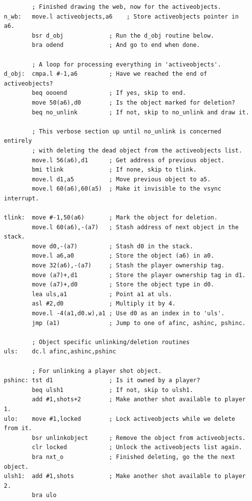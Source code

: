\begin{lstlisting}
        ; Finished drawing the web, now for the activeobjects.
n_wb:   move.l activeobjects,a6    ; Store activeobjects pointer in a6.
        bsr d_obj             ; Run the d_obj routine below.
        bra odend             ; And go to end when done.
    
        ; A loop for processing everything in 'activeobjects'.
d_obj:  cmpa.l #-1,a6         ; Have we reached the end of activeobjects?
        beq oooend            ; If yes, skip to end.
        move 50(a6),d0        ; Is the object marked for deletion?
        beq no_unlink         ; If not, skip to no_unlink and draw it.
    
        ; This verbose section up until no_unlink is concerned entirely
        ; with deleting the dead object from the activeobjects list.
        move.l 56(a6),d1      ; Get address of previous object.
        bmi tlink             ; If none, skip to tlink.
        move.l d1,a5          ; Move previous object to a5.
        move.l 60(a6),60(a5)  ; Make it invisible to the vsync interrupt.
    
tlink:  move #-1,50(a6)       ; Mark the object for deletion.
        move.l 60(a6),-(a7)   ; Stash address of next object in the stack.
        move d0,-(a7)         ; Stash d0 in the stack.
        move.l a6,a0          ; Store the object (a6) in a0.
        move 32(a6),-(a7)     ; Stash the player ownership tag.
        move (a7)+,d1         ; Store the player ownership tag in d1.
        move (a7)+,d0         ; Store the object type in d0.
        lea uls,a1            ; Point a1 at uls.
        asl #2,d0             ; Multiply it by 4.
        move.l -4(a1,d0.w),a1 ; Use d0 as an index in to 'uls'.
        jmp (a1)              ; Jump to one of afinc, ashinc, pshinc.
    
        ; Object specific unlinking/deletion routines
uls:    dc.l afinc,ashinc,pshinc
    
        ; For unlinking a player shot object.
pshinc: tst d1                ; Is it owned by a player?
        beq ulsh1             ; If not, skip to ulsh1.
        add #1,shots+2        ; Make another shot available to player 1.
ulo:    move #1,locked        ; Lock activeobjects while we delete from it.
        bsr unlinkobject      ; Remove the object from activeobjects.
        clr locked            ; Unlock the activeobjects list again.
        bra nxt_o             ; Finished deleting, go the the next object.
ulsh1:  add #1,shots          ; Make another shot available to player 2.
        bra ulo
    

\end{lstlisting}
